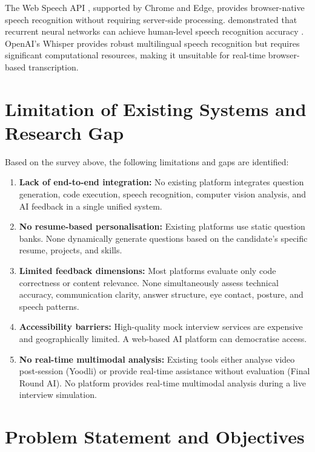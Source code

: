 The Web Speech API \cite{webspeechapi2024}, supported by Chrome and Edge, provides browser-native speech recognition without requiring server-side processing. \citeauthor{graves2013speech} demonstrated that recurrent neural networks can achieve human-level speech recognition accuracy \cite{graves2013speech}. OpenAI's Whisper \cite{radford2023robust} provides robust multilingual speech recognition but requires significant computational resources, making it unsuitable for real-time browser-based transcription.

\section{Limitation of Existing Systems and Research Gap}

Based on the survey above, the following limitations and gaps are identified:

\begin{enumerate}
    \item \textbf{Lack of end-to-end integration:} No existing platform integrates question generation, code execution, speech recognition, computer vision analysis, and AI feedback in a single unified system.

    \item \textbf{No resume-based personalisation:} Existing platforms use static question banks. None dynamically generate questions based on the candidate's specific resume, projects, and skills.

    \item \textbf{Limited feedback dimensions:} Most platforms evaluate only code correctness or content relevance. None simultaneously assess technical accuracy, communication clarity, answer structure, eye contact, posture, and speech patterns.

    \item \textbf{Accessibility barriers:} High-quality mock interview services are expensive and geographically limited. A web-based AI platform can democratise access.

    \item \textbf{No real-time multimodal analysis:} Existing tools either analyse video post-session (Yoodli) or provide real-time assistance without evaluation (Final Round AI). No platform provides real-time multimodal analysis during a live interview simulation.
\end{enumerate}

\section{Problem Statement and Objectives}

